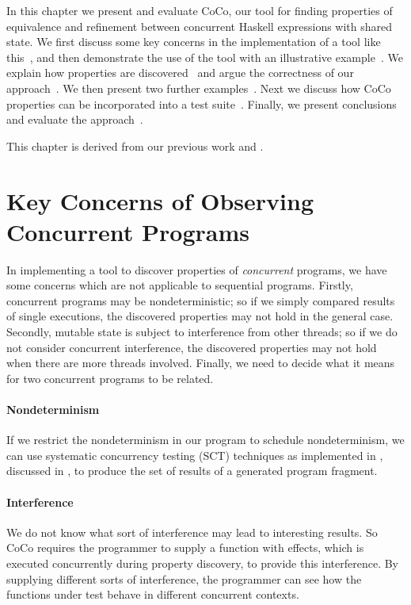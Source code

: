 In this chapter we present and evaluate CoCo, our tool for finding
properties of equivalence and refinement between concurrent Haskell
expressions with shared state.  We first discuss some key concerns in
the implementation of a tool like this~, and then
demonstrate the use of the tool with an illustrative
example~.  We explain how properties are
discovered~ and argue the correctness of our
approach~.  We then present two further
examples~.  Next we discuss how CoCo properties can
be incorporated into a \dejafu{} test suite~.
Finally, we present conclusions and evaluate the
approach~.

This chapter is derived from our previous work \cite{tfp-coco} and
\cite{walker2018}.

\section{Key Concerns of Observing Concurrent Programs}
\label{sec:coco-concerns}

In implementing a tool to discover properties of \emph{concurrent}
programs, we have some concerns which are not applicable to sequential
programs.  Firstly, concurrent programs may be nondeterministic; so if
we simply compared results of single executions, the discovered
properties may not hold in the general case.  Secondly, mutable state
is subject to interference from other threads; so if we do not
consider concurrent interference, the discovered properties may not
hold when there are more threads involved.  Finally, we need to decide
what it means for two concurrent programs to be related.

\paragraph{Nondeterminism}
If we restrict the nondeterminism in our program to schedule
nondeterminism, we can use systematic concurrency testing
(SCT)\cite{coons2013,flanagan2005,musuvathi2008,musuvathi2007}
techniques as implemented in \dejafu{}, discussed in
, to produce the set of results of a generated
program fragment.

\paragraph{Interference}
We do not know what sort of interference may lead to interesting
results.  So CoCo requires the programmer to supply a function with
effects, which is executed concurrently during property discovery, to
provide this interference.  By supplying different sorts of
interference, the programmer can see how the functions under test
behave in different concurrent contexts.


